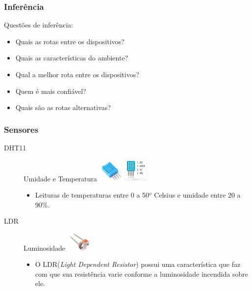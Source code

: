 
\begin{frame}
	\frametitle{Inferência}
	Questões de inferência:
	
	\begin{itemize}
		\item Quais as rotas entre os dispositivos?
		\item Quais as características do ambiente?
		\item Qual a melhor rota entre os dispositivos?
		\item Quem é mais confiável?
		\item Quais são as rotas alternativas?
	\end{itemize}
\end{frame}


\begin{frame}
	\frametitle{Sensores} %

\begin{description}
	\item [DHT11] Umidade e Temperatura \includegraphics[width=0.1\textwidth]{"../Relatorio/Artigo IoT-G4/figs/dht11"}
	\includegraphics[width=0.1\textwidth]{"../Relatorio/Artigo IoT-G4/figs/dht11-pinagem"}
	\begin{itemize}
		\item Leituras de temperaturas entre 0 a 50$^o$ Celsius e umidade entre 20 a 90\%.
	\end{itemize}
	\item [LDR] Luminosidade \includegraphics[width=0.1\textwidth]{"../Relatorio/Artigo IoT-G4/figs/ldr"}
	\begin{itemize}
		\item O LDR(\textit{Light Dependent Resistor}) possui uma característica que faz com que sua resistência varie conforme a luminosidade incendida  sobre ele.
	\end{itemize}
\end{description}

\end{frame}

